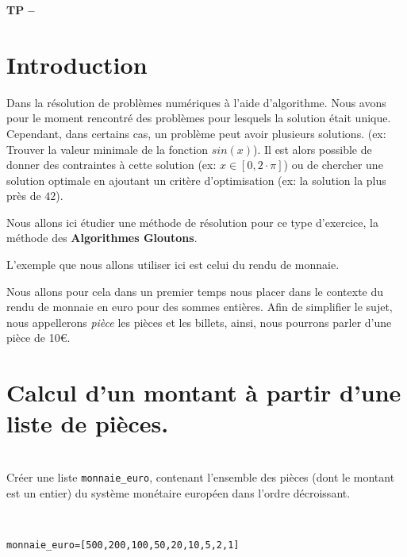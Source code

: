 

%
\usepackage{eurosym}




\begin{center}
{\Large\bf TP \no {\numero} -- \descrip}
\end{center}

\section{Introduction}

Dans la résolution de problèmes numériques à l'aide d'algorithme. Nous avons pour le moment rencontré des problèmes pour lesquels la solution était unique. Cependant, dans certains cas, un problème peut avoir plusieurs solutions. (ex: Trouver la valeur minimale de la fonction $sin(x)$). Il est alors possible de donner des contraintes à cette solution (ex: $x\in[0,2\cdot\pi]$) ou de chercher une solution optimale en ajoutant un critère d'optimisation (ex: la solution la plus près de $42$).

Nous allons ici étudier une méthode de résolution pour ce type d'exercice, la méthode des \textbf{Algorithmes Gloutons}.

L'exemple que nous allons utiliser ici est celui du rendu de monnaie.

Nous allons pour cela dans un premier temps nous placer dans le contexte du rendu de monnaie en euro pour des sommes entières. Afin de simplifier le sujet, nous appellerons \textit{pièce} les pièces et les billets, ainsi, nous pourrons parler d'une pièce de 10\euro.

\section{Calcul d'un montant à partir d'une liste de pièces.}
\begin{exercice}~\\
Créer une liste \verb?monnaie_euro?, contenant l'ensemble des pièces (dont le montant est un entier) du système monétaire européen dans l'ordre décroissant.
\end{exercice}

\begin{solution}~\ \\
\begin{verbatim}
monnaie_euro=[500,200,100,50,20,10,5,2,1]
\end{verbatim}
\end{solution}

